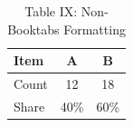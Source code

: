 \documentclass{article}
\begin{document}
\begin{table}[htbp]
\centering
\caption{Table IX: Non-Booktabs Formatting}
\begin{tabular}{|l|c|c|}
\hline
Item & A & B \\
\hline
Count & 12 & 18 \\
Share & 40\% & 60\% \\
\hline
\end{tabular}
\end{table}
\end{document}
